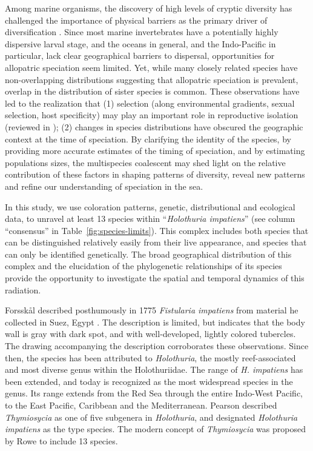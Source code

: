 \documentclass[12pt,letterpaper]{article}\usepackage[]{graphicx}\usepackage[]{color}
\begin{document}
Among marine organisms, the discovery of high levels of cryptic diversity has
challenged the importance of physical barriers as the primary driver of
diversification \citep{Mayr1954}. Since most marine invertebrates have a
potentially highly dispersive larval stage, and the oceans in general, and the
Indo-Pacific in particular, lack clear geographical barriers to dispersal,
opportunities for allopatric speciation seem limited. Yet, while many closely
related species have non-overlapping distributions suggesting that allopatric
speciation is prevalent, overlap in the distribution of sister species is
common. These observations have led to the realization that (1) selection (along
environmental gradients, sexual selection, host specificity) may play an
important role in reproductive isolation (reviewed in \citep{Bowen2013}); (2)
changes in species distributions have obscured the geographic context at the
time of speciation. By clarifying the identity of the species, by providing more
accurate estimates of the timing of speciation, and by estimating populations
sizes, the multispecies coalescent may shed light on the relative contribution
of these factors in shaping patterns of diversity, reveal new patterns and
refine our understanding of speciation in the sea.

In this study, we use coloration patterns, genetic, distributional and
ecological data, to unravel at least 13 species within ``\textit{Holothuria
  impatiens}'' (see column ``consensus'' in
Table~\ref{fig:species-limits}). This complex includes both species that can be
distinguished relatively easily from their live appearance, and species that can
only be identified genetically. The broad geographical distribution of this
complex and the elucidation of the phylogenetic relationships of its species
provide the opportunity to investigate the spatial and temporal dynamics of this
radiation.

Forssk\r{a}l described posthumously in 1775 \textit{Fistularia impatiens} from
material he collected in Suez, Egypt \citep{Forsskal1775}. The description is
limited, but indicates that the body wall is gray with dark spot, and with
well-developed, lightly colored tubercles. The drawing accompanying the
description corroborates these observations. Since then, the species has been
attributed to \textit{Holothuria}, the mostly reef-associated and most diverse
genus within the Holothuriidae. The range of \textit{H. impatiens} has been
extended, and today is recognized as the most widespread species in the
genus. Its range extends from the Red Sea through the entire Indo-West Pacific,
to the East Pacific, Caribbean and the Mediterranean. Pearson \citep{Pearson1915}
described \textit{Thymiosycia} as one of five subgenera in \textit{Holothuria},
and designated \textit{Holothuria impatiens} as the type species. The modern
concept of \textit{Thymiosycia} was proposed by Rowe \citep{Rowe1969} to include
13 species.
\end{document}
